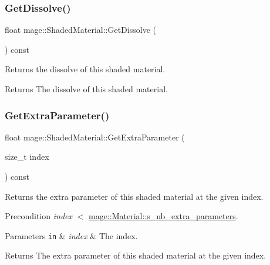 \subsubsection{\texorpdfstring{Get\+Dissolve()}{GetDissolve()}}
{\footnotesize\ttfamily float mage\+::\+Shaded\+Material\+::\+Get\+Dissolve (\begin{DoxyParamCaption}{ }\end{DoxyParamCaption}) const\hspace{0.3cm}{\ttfamily [noexcept]}}

Returns the dissolve of this shaded material.

\begin{DoxyReturn}{Returns}
The dissolve of this shaded material. 
\end{DoxyReturn}
\hypertarget{structmage_1_1_shaded_material_af2843c2ec63800443e6fee28147cd8bb}{}\label{structmage_1_1_shaded_material_af2843c2ec63800443e6fee28147cd8bb} 
\subsubsection{\texorpdfstring{Get\+Extra\+Parameter()}{GetExtraParameter()}}
{\footnotesize\ttfamily float mage\+::\+Shaded\+Material\+::\+Get\+Extra\+Parameter (\begin{DoxyParamCaption}\item[{size\+\_\+t}]{index }\end{DoxyParamCaption}) const\hspace{0.3cm}{\ttfamily [noexcept]}}

Returns the extra parameter of this shaded material at the given index.

\begin{DoxyPrecond}{Precondition}
{\itshape index} {\ttfamily $<$} \hyperlink{structmage_1_1_material_ab8d10c2cb8ab77bee18654e63acaa63a}{mage\+::\+Material\+::s\+\_\+nb\+\_\+extra\+\_\+parameters}. 
\end{DoxyPrecond}

\begin{DoxyParams}[1]{Parameters}
\mbox{\tt in}  & {\em index} & The index. \\
\hline
\end{DoxyParams}
\begin{DoxyReturn}{Returns}
The extra parameter of this shaded material at the given index. 
\end{DoxyReturn}
\hypertarget{structmage_1_1_shaded_material_a4078cfbed3a919214428ab01d991b589}{}\label{structmage_1_1_shaded_material_a4078cfbed3a919214428ab01d991b589} 
